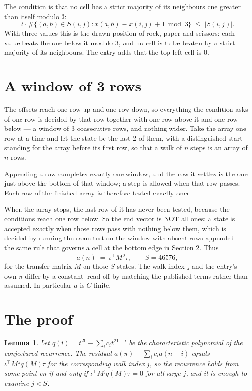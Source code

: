 \documentclass[11pt,a4paper]{article}
\theoremstyle{plain}
\newtheorem{lemma}[theorem]{Lemma}
\theoremstyle{definition}
\begin{document}
The condition is that no cell has a strict majority of its neighbours one greater than itself modulo $3$:
\[
2\cdot\#\{(a,b)\in S(i,j) : x(a,b)\equiv x(i,j)+1 \bmod 3\}\;\le\;|S(i,j)| .
\]
With three values this is the drawn position of rock, paper and scissors: each value beats the one below it modulo $3$, and no cell is to be beaten by a strict majority of its neighbours. The entry adds that the top-left cell is $0$.

\section{A window of 3 rows}

The offsets reach one row up and one row down, so everything the condition asks of one row is
decided by that row together with one row above it and one row below --- a window of
$3$ consecutive rows, and nothing wider. Take the array one row at a time
and let the state be the last 2 of them, with a distinguished start standing for the
array before its first row, so that a walk of $n$ steps is an array of $n$ rows.

Appending a row completes exactly one window, and the row it settles is the one just above the bottom of that window; a step is
allowed when that row passes. Each row of the finished
array is therefore tested exactly once.

When the array stops, the last row of it has never been tested, because the
conditions reach one row below. So the end vector is NOT all ones: a state is accepted exactly when
those rows pass with nothing below them, which is decided by running the same test on the window
with absent rows appended --- the same rule that governs a cell at the bottom edge in
Section 2.
Thus
\[
a(n)\;=\;\iota^{\!\top}M^{\,j}\tau ,\qquad S=46576,
\]
for the transfer matrix $M$ on those $S$ states. The walk index $j$ and the entry's own $n$
differ by a constant, read off by matching the published terms rather than assumed. In
particular $a$ is $C$-finite.

\section{The proof}

\begin{lemma}\label{lem:crit}
Let $q(t)=t^{21}-\sum_i c_it^{21-i}$ be the characteristic polynomial of the
conjectured recurrence. The residual $a(n)-\sum_ic_ia(n-i)$ equals
$\iota^{\!\top}M^{\,j}q(M)\tau$ for the corresponding walk index $j$, so the recurrence
holds from some point on if and only if $\iota^{\!\top}M^{j}q(M)\tau=0$ for all large $j$,
and it is enough to examine $j<S$.
\end{lemma}
\end{document}
